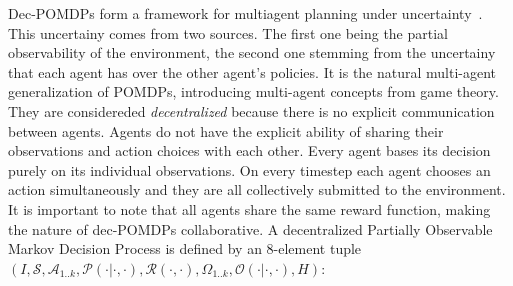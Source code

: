 \documentclass{../main.tex}{subfile}
\begin{document}
Dec-POMDPs form a framework for multiagent planning under uncertainty~\citep{Oliehoek2014}. This uncertainy comes from two sources. The first one being the partial observability of the environment, the second one stemming from the uncertainy that each agent has over the other agent's policies. It is the natural multi-agent generalization of POMDPs, introducing multi-agent concepts from game theory. They are considereded \textit{decentralized} because there is no explicit communication between agents. Agents do not have the explicit ability of sharing their observations and action choices with each other. Every agent bases its decision purely on its individual observations. On every timestep each agent chooses an action simultaneously and they are all collectively submitted to the environment. It is important to note that all agents share the same reward function, making the nature of dec-POMDPs collaborative. A decentralized Partially Observable Markov Decision Process is defined by an 8-element tuple $(I, \mathcal{S}, \mathcal{A}_{1..k}, \mathcal{P}(\cdot | \cdot, \cdot), \mathcal{R}(\cdot, \cdot), \Omega_{1..k}, \mathcal{O(\cdot | \cdot, \cdot)}, H)$:
\end{document}

